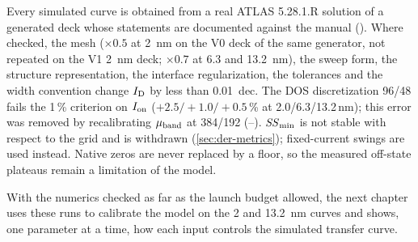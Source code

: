 \begin{keyresult}
Every simulated curve is obtained from a real ATLAS 5.28.1.R solution of a generated deck whose statements are
documented against the manual (\evNUM). Where checked, the mesh ($\times 0.5$ at \SI{2}{nm} on the V0 deck of the same
generator, not repeated on the V1 \SI{2}{nm} deck; $\times 0.7$ at 6.3 and \SI{13.2}{nm}), the sweep form, the structure
representation, the interface regularization, the tolerances and the width convention change $I_{\mathrm{D}}$ by less than
\SI{0.01}{dec}. The DOS discretization 96/48 fails the 1\,\% criterion on $I_{\mathrm{on}}$ ($+2.5/+1.0/+0.5$\,\% at
2.0/6.3/13.2\,nm); this error was removed by recalibrating $\mu_{\mathrm{band}}$ at 384/192 (--). $\mathit{SS}_{\min}$ is
not stable with respect to the grid and is withdrawn (\cref{sec:der-metrics}); fixed-current swings are used instead.
Native zeros are never replaced by a floor, so the measured off-state plateaus remain a limitation of the model.
\end{keyresult}

With the numerics checked as far as the launch budget allowed, the next chapter uses these runs to calibrate the model on
the 2 and \SI{13.2}{nm} curves and shows, one parameter at a time, how each input controls the simulated transfer curve.
